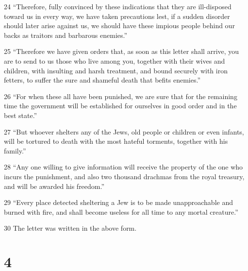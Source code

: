 \par 24 “Therefore, fully convinced by these indications that they are ill-disposed toward us in every way, we have taken precautions lest, if a sudden disorder should later arise against us, we should have these impious people behind our backs as traitors and barbarous enemies.”
\par 25 “Therefore we have given orders that, as soon as this letter shall arrive, you are to send to us those who live among you, together with their wives and children, with insulting and harsh treatment, and bound securely with iron fetters, to suffer the sure and shameful death that befits enemies.”
\par 26 “For when these all have been punished, we are sure that for the remaining time the government will be established for ourselves in good order and in the best state.”
\par 27 “But whoever shelters any of the Jews, old people or children or even infants, will be tortured to death with the most hateful torments, together with his family.”
\par 28 “Any one willing to give information will receive the property of the one who incurs the punishment, and also two thousand drachmas from the royal treasury, and will be awarded his freedom.”
\par 29 “Every place detected sheltering a Jew is to be made unapproachable and burned with fire, and shall become useless for all time to any mortal creature.”
\par 30 The letter was written in the above form.

\chapter{4}

